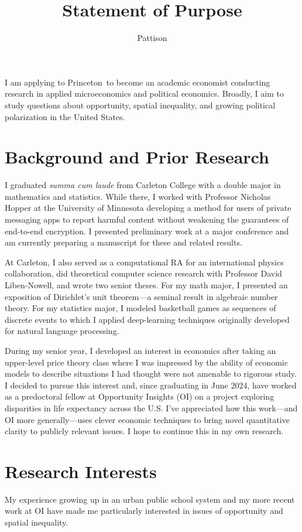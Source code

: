 \documentclass{grad-statement}
\author{Pattison}
\title{Statement of Purpose}
\newcommand\program{Princeton}
\begin{document}
\noindent
I am applying to \program\ to become an academic economist conducting research in applied microeconomics and political economics.
Broadly, I aim to study	questions about opportunity, spatial inequality, and growing political polarization in the United States.

\section{Background and Prior Research}

I graduated \emph{summa cum laude} from Carleton College with a double major in mathematics and statistics.
While there, I worked with Professor Nicholas Hopper at the University of Minnesota developing a method for users of private messaging apps to report harmful content without weakening the guarantees of end-to-end encryption.
I presented preliminary work at a major conference and am currently preparing a manuscript for these and related results.

At Carleton, I also served as a computational RA for an international physics collaboration, did theoretical computer science research with Professor David Liben-Nowell, and wrote two senior theses.
For my math major, I presented an exposition of Dirichlet's unit theorem---a seminal result in algebraic number theory.
For my statistics major, I modeled basketball games as sequences of discrete events to which I applied deep-learning techniques originally developed for natural language processing.

During my senior year, I developed an interest in economics after taking an upper-level price theory class where I was impressed by the ability of economic models to describe situations I had thought were not amenable to rigorous study.
I decided to pursue this interest and, since graduating in June 2024, have worked as a predoctoral fellow at Opportunity Insights (OI) on a project exploring disparities in life expectancy across the U.S.
I've appreciated how this work---and OI more generally---uses clever economic techniques to bring novel quantitative clarity to publicly relevant issues.
I hope to continue this in my own research.

\section{Research Interests}

My experience growing up in an urban public school system and my more recent work at OI have made me particularly interested in issues of opportunity and spatial inequality.
\end{document}
